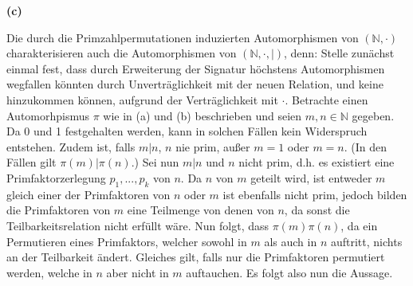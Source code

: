\documentclass[11pt, a4paper]{article}
\begin{document}
\textbf{(c)}
\begin{adjustwidth}{20pt}{20pt}
	Die durch die Primzahlpermutationen induzierten Automorphismen von $(\mathbb{N},\cdot)$ charakterisieren auch die Automorphismen von $(\mathbb{N},\cdot,|)$, denn: Stelle zunächst einmal
	fest, dass durch Erweiterung der Signatur höchstens Automorphismen wegfallen könnten durch Unverträglichkeit mit der neuen Relation, und keine hinzukommen können, aufgrund der Verträglichkeit
	mit $\cdot$. Betrachte einen Automorhpismus $\pi$ wie in (a) und (b) beschrieben und seien $m,n \in \mathbb{N}$ gegeben. Da 0 und 1 festgehalten werden, kann in solchen Fällen kein
	Widerspruch entstehen. Zudem ist, falls $m|n$, $n$ nie prim, außer $m=1$ oder $m=n$. (In den Fällen gilt $\pi(m)|\pi(n)$.) Sei nun $m|n$ und $n$ nicht prim, d.h. es existiert eine
	Primfaktorzerlegung $p_1,...,p_k$ von $n$. Da $n$ von $m$ geteilt wird, ist entweder $m$ gleich einer der Primfaktoren von $n$ oder $m$ ist ebenfalls nicht prim, jedoch bilden die
	Primfaktoren von $m$ eine Teilmenge von denen von $n$, da sonst die Teilbarkeitsrelation nicht erfüllt wäre. Nun folgt, dass $\pi(m)\pi(n)$, da ein Permutieren eines Primfaktors, welcher 		sowohl in $m$ als auch in $n$ auftritt, nichts an der Teilbarkeit ändert. Gleiches gilt, falls nur die Primfaktoren permutiert werden, welche in $n$ aber nicht in $m$ auftauchen.
	Es folgt also nun die Aussage.
\end{adjustwidth}
\end{document}
